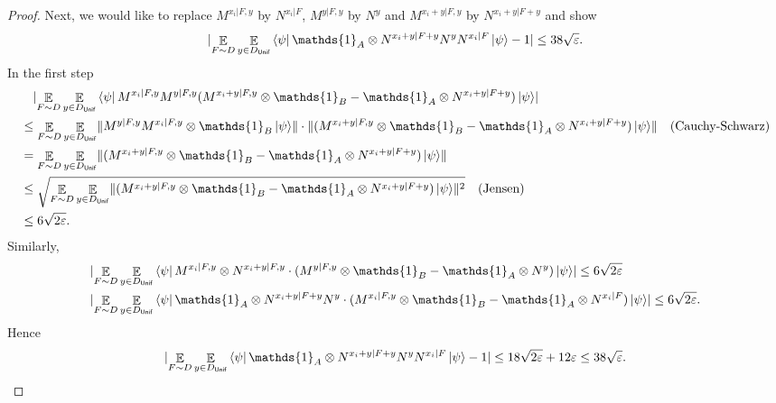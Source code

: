 \documentclass[10pt,a4paper]{article}
\theoremstyle{plain}
\theoremstyle{definition}
\DeclarePairedDelimiter{\norm}{\lVert}{\rVert}
\DeclarePairedDelimiter{\abs}{\lvert}{\rvert}
\newcommand {\bra} [1] {\ensuremath{ \left\langle #1 \right| }}
\newcommand {\ket} [1] {\ensuremath{ \left| #1 \right\rangle }}
\DeclareMathOperator*{\bigE}{\mathbb{E}}
\newcommand {\id} {\ensuremath{\mathds{1}}}
\newcommand{\ep} {\ensuremath{\varepsilon}}
\newcommand{\x}{\otimes}
\newcommand{\1}{\mathbb{1}} %
\newcommand{\Unif}{\mathsf{Unif}}
\begin{document}
\begin{proof}
Next, we would like to replace $M^{x_i | F, y}$ by $N^{x_i | F}$, $M^{y | F,y}$ by $N^y$ and $M^{x_i +y | F,y}$ by $N^{x_i+y|F+y}$
and show 
\begin{align}
	\label{eq:N_xy}
	\abs{\bigE_{F \sim D}  \bigE_{y \in D_{\Unif}} \bra{\psi} \id_A \x N^{x_i+y| F+y} N^y N^{x_i  | F } \ket{\psi}-1} \leq 38\sqrt{\ep}.
\end{align}
In the first step
\begin{align*}
	&\quad \abs{ \bigE_{F \sim D}  \bigE_{y \in D_{\Unif}} \bra{\psi} M^{x_i | F, y} M^{y | F, y} ( M^{x_i+y| F, y}\x\id_B -\id_A \x N^{x_i+y | F + y}) \ket{\psi} }\\
	&\leq \bigE_{F \sim D}  \bigE_{y \in D_{\Unif}} \norm{ M^{y | F, y} M^{x_i | F, y} \x \id_B \ket{\psi}}
	\cdot \norm{ (M^{x_i+y| F, y} \x\id_B- \id_A \x N^{x_i+y | F + y}) \ket{\psi} } \quad\mbox{(Cauchy-Schwarz)}\\
	&= \bigE_{F \sim D}  \bigE_{y \in D_{\Unif}} \norm{ (M^{x_i+y| F, y}\x\id_B - \id_A \x N^{x_i+y | F + y}) \ket{\psi} } \\
	& \leq \sqrt{  \bigE_{F \sim D}  \bigE_{y \in D_{\Unif}} \norm{ (M^{x_i+y| F, y} \x \id_B- \id_A \x N^{x_i+y | F + y}) \ket{\psi} }^2 } \quad\mbox{(Jensen)}\\
	& \leq 6\sqrt{2\ep}.
\end{align*}
Similarly,
\begin{align*}
	&\abs{ \bigE_{F \sim D}  \bigE_{y \in D_{\Unif}} \bra{\psi} M^{x_i | F, y} \x N^{x_i+ y | F, y} \cdot ( M^{y | F, y} \x \id_B - \id_A \x N^y) \ket{\psi}}  \leq 6\sqrt{2\ep} \\
	&\abs{ \bigE_{F \sim D}  \bigE_{y \in D_{\Unif}} \bra{\psi} \id_A \x N^{x_i+y | F + y} N^y \cdot  (M^{x_i | F,y} \x \id_B - \id_A \x N^{x_i | F}) \ket{\psi}} \leq 6\sqrt{2\ep} .
\end{align*}
Hence 
\begin{align*}
	\abs{  \bigE_{F \sim D}  \bigE_{y \in D_{\Unif}} \bra{\psi}  \id_A \x N^{x_i+y | F + y} N^y N^{x_i | F} \ket{\psi} - 1} \leq 18\sqrt{2\ep} + 12 \ep \leq 38\sqrt{\ep}.
\end{align*}


\end{proof}
\end{document}
